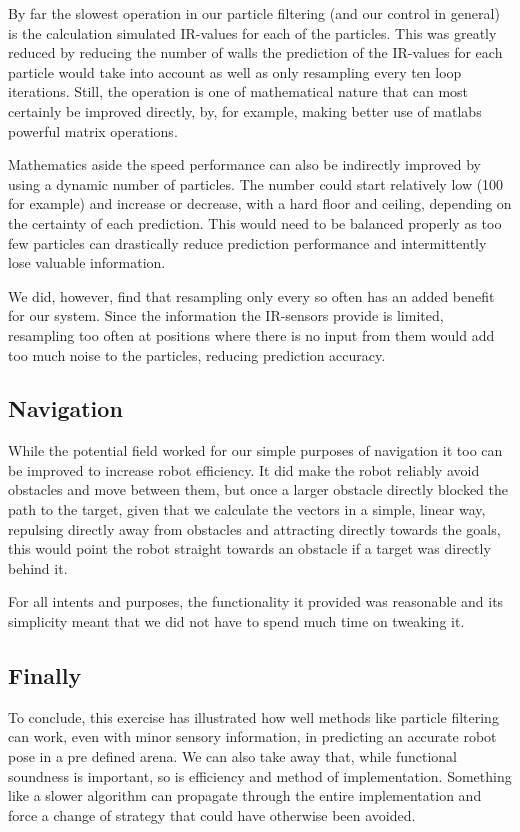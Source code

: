 \documentclass[paper=a4, fontsize=12pt]{scrartcl}	%
\numberwithin{equation}{section}		%
\numberwithin{figure}{section}			%
\numberwithin{table}{section}				%
\begin{document}
By far the slowest operation in our particle filtering (and our control in general) is the calculation simulated IR-values for each of the particles. This was greatly reduced by reducing the number of walls the prediction of the IR-values for each particle would take into account as well as only resampling every ten loop iterations. Still, the operation is one of mathematical nature that can most certainly be improved directly, by, for example, making better use of matlabs powerful matrix operations.

Mathematics aside the speed performance can also be indirectly improved by using a dynamic number of particles. The number could start relatively low (100 for example) and increase or decrease, with a hard floor and ceiling, depending on the certainty of each prediction. This would need to be balanced properly as too few particles can drastically reduce prediction performance and intermittently lose valuable information.

We did, however, find that resampling only every so often has an added benefit for our system. Since the information the IR-sensors provide is limited, resampling too often at positions where there is no input from them would add too much noise to the particles, reducing prediction accuracy.
\subsection{Navigation}
While the potential field worked for our simple purposes of navigation it too can be improved to increase robot efficiency. It did make the robot reliably avoid obstacles and move between them, but once a larger obstacle directly blocked the path to the target, given that we calculate the vectors in a simple, linear way, repulsing directly away from obstacles and attracting directly towards the goals, this would point the robot straight towards an obstacle if a target was directly behind it.

For all intents and purposes, the functionality it provided was reasonable and its simplicity meant that we did not have to spend much time on tweaking it.
\subsection{Finally}
To conclude, this exercise has illustrated how well methods like particle filtering can work, even with minor sensory information, in predicting an accurate robot pose in a pre defined arena. We can also take away that, while functional soundness is important, so is efficiency and method of implementation. Something like a slower algorithm can propagate through the entire implementation and force a change of strategy that could have otherwise been avoided.
\end{document}
